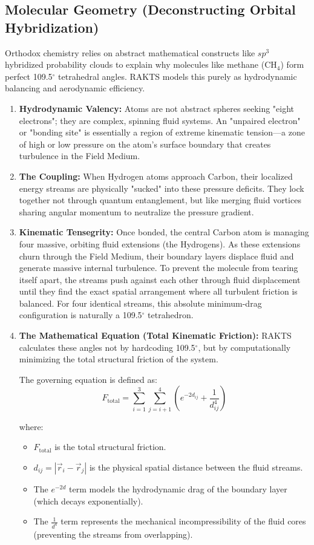 \documentclass[reprint,amsmath,amssymb,aps,prd,twocolumn]{revtex4-2}
\begin{document}
\subsection{Molecular Geometry (Deconstructing Orbital Hybridization)}
Orthodox chemistry relies on abstract mathematical constructs like $sp^3$ hybridized probability clouds to explain why molecules like methane (CH$_4$) form perfect 109.5$^\circ$ tetrahedral angles. RAKTS models this purely as hydrodynamic balancing and aerodynamic efficiency.

\begin{enumerate}
    \item \textbf{Hydrodynamic Valency:} Atoms are not abstract spheres seeking "eight electrons"; they are complex, spinning fluid systems. An "unpaired electron" or "bonding site" is essentially a region of extreme kinematic tension—a zone of high or low pressure on the atom's surface boundary that creates turbulence in the Field Medium.
    \item \textbf{The Coupling:} When Hydrogen atoms approach Carbon, their localized energy streams are physically "sucked" into these pressure deficits. They lock together not through quantum entanglement, but like merging fluid vortices sharing angular momentum to neutralize the pressure gradient.
    \item \textbf{Kinematic Tensegrity:} Once bonded, the central Carbon atom is managing four massive, orbiting fluid extensions (the Hydrogens). As these extensions churn through the Field Medium, their boundary layers displace fluid and generate massive internal turbulence. To prevent the molecule from tearing itself apart, the streams push against each other through fluid displacement until they find the exact spatial arrangement where all turbulent friction is balanced. For four identical streams, this absolute minimum-drag configuration is naturally a 109.5$^\circ$ tetrahedron.
    \item \textbf{The Mathematical Equation (Total Kinematic Friction):} RAKTS calculates these angles not by hardcoding 109.5$^\circ$, but by computationally minimizing the total structural friction of the system. 

    The governing equation is defined as:
    \[
    F_{\text{total}} = \sum_{i=1}^{3} \sum_{j=i+1}^{4} \left( e^{-2d_{ij}} + \frac{1}{d_{ij}^4} \right)
    \]

    where:
    \begin{itemize}
        \item $F_{\text{total}}$ is the total structural friction.
        \item $d_{ij} = |\vec{r}_i - \vec{r}_j|$ is the physical spatial distance between the fluid streams.
        \item The $e^{-2d}$ term models the hydrodynamic drag of the boundary layer (which decays exponentially).
        \item The $\frac{1}{d^4}$ term represents the mechanical incompressibility of the fluid cores (preventing the streams from overlapping).
    \end{itemize}


\end{enumerate}
\end{document}
